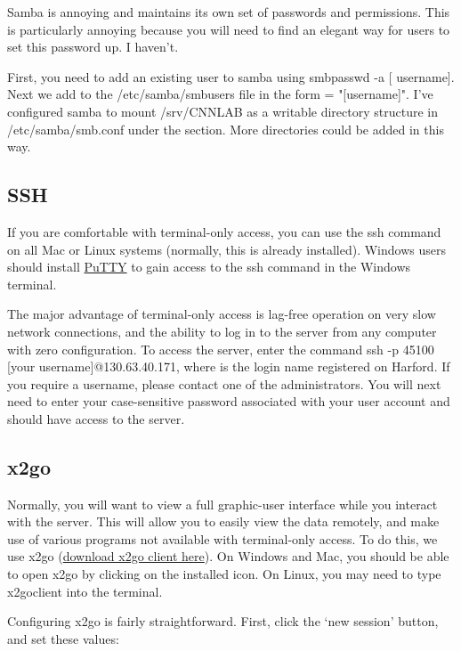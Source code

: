 \documentclass[final,titlepage,letterpaper,oneside,12pt]{article}
\renewcommand{\texttt}[2][BrickRed]{\textcolor{#1}{\ttfamily #2}}%
\begin{document}
Samba is annoying and maintains its own set of passwords and permissions. This is particularly annoying because you will need to find an elegant way for users to set this password up. I haven't.

First, you need to add an existing user to samba using \texttt{smbpasswd -a [
username]}. Next we add \texttt{[username]}  to the \texttt{/etc/samba/smbusers} file in the form \texttt{[username] = "[username]"}. I've configured samba to mount \texttt{/srv/CNNLAB} as a writable directory structure in \texttt{/etc/samba/smb.conf} under the \texttt{[CNNLAB]} section. More directories could be added in this way. 

\subsection{SSH}

If you are comfortable with terminal-only access, you can use the \texttt{ssh} command on all Mac or Linux systems (normally, this is already installed). Windows users should install \href{http://www.chiark.greenend.org.uk/~sgtatham/putty/}{PuTTY} to gain access to the \texttt{ssh} command in the Windows terminal.

The major advantage of terminal-only access is lag-free operation on very slow network connections, and the ability to log in to the server from any computer with zero configuration. To access the server, enter the command \texttt{ssh -p 45100 [your username]@130.63.40.171}, where \texttt{[your username]} is the login name registered on Harford. If you require a username, please contact one of the administrators. You will next need to enter your case-sensitive password associated with your user account and should have access to the server.

\subsection{x2go}

Normally, you will want to view a full graphic-user interface while you interact with the server. This will allow you to easily view the data remotely, and make use of various programs not available with terminal-only access. To do this, we use x2go (\href{http://wiki.x2go.org/doku.php}{download x2go client here}). On Windows and Mac, you should be able to open x2go by clicking on the installed icon. On Linux, you may need to type \texttt{x2goclient} into the terminal.

Configuring x2go is fairly straightforward. First, click the `new session' button, and set these values:
\end{document}
